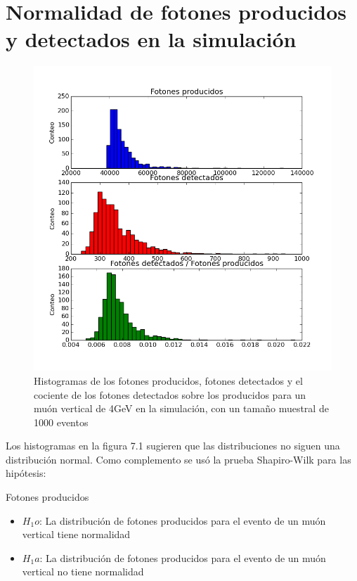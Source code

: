 \documentclass{book}
\begin{document}


\pagebreak
\section{Normalidad de fotones producidos y detectados en la simulaci\'on}

\begin{figure}[h] %
\begin{center}
 \includegraphics[width=0.8\linewidth]{FotonesMuonVerticalG4.png}
\caption{Histogramas de los fotones producidos, fotones detectados y el cociente de los fotones detectados sobre los producidos para un mu\'on vertical de 4GeV en la simulaci\'on, con un tama\~no muestral de 1000 eventos}
\end{center}
\end{figure}

Los histogramas en la figura 7.1 sugieren que las distribuciones no siguen una distribuci\'on normal. Como complemento se us\'o la prueba Shapiro-Wilk para las hip\'otesis:

Fotones producidos
\begin{itemize}
\item $H_1o$: La distribuci\'on de fotones producidos para el evento de un mu\'on vertical tiene normalidad
\item $H_1a$: La distribuci\'on de fotones producidos para el evento de un mu\'on vertical no tiene normalidad
\end{itemize}
\end{document}
